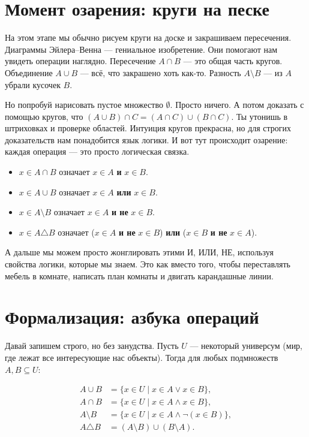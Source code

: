 \section{Момент озарения: круги на песке}
\label{sec:venn-insight}

На этом этапе мы обычно рисуем круги на доске и закрашиваем пересечения. Диаграммы Эйлера--Венна — гениальное изобретение. Они помогают нам увидеть операции наглядно. Пересечение $A \cap B$ — это общая часть кругов. Объединение $A \cup B$ — всё, что закрашено хоть как-то. Разность $A \setminus B$ — из $A$ убрали кусочек $B$.

Но попробуй нарисовать пустое множество $\emptyset$. Просто ничего. А потом доказать с помощью кругов, что $(A \cup B) \cap C = (A \cap C) \cup (B \cap C)$. Ты утонишь в штриховках и проверке областей. Интуиция кругов прекрасна, но для строгих доказательств нам понадобится язык логики. И вот тут происходит озарение: каждая операция — это просто логическая связка.

\begin{itemize}
  \item $x \in A \cap B$ \quad означает \quad $x \in A$ \textbf{и} $x \in B$.
  \item $x \in A \cup B$ \quad означает \quad $x \in A$ \textbf{или} $x \in B$.
  \item $x \in A \setminus B$ \quad означает \quad $x \in A$ \textbf{и не} $x \in B$.
  \item $x \in A \triangle B$ \quad означает \quad ($x \in A$ \textbf{и не} $x \in B$) \textbf{или} ($x \in B$ \textbf{и не} $x \in A$).
\end{itemize}

А дальше мы можем просто жонглировать этими И, ИЛИ, НЕ, используя свойства логики, которые мы знаем. Это как вместо того, чтобы переставлять мебель в комнате, написать план комнаты и двигать карандашные линии.

\section{Формализация: азбука операций}
\label{sec:operations-formal}

Давай запишем строго, но без занудства. Пусть $U$ — некоторый универсум (мир, где лежат все интересующие нас объекты). Тогда для любых подмножеств $A, B \subseteq U$:

\begin{align}
  A \cup B &= \{x \in U \mid x \in A \lor x \in B\},\\
  A \cap B &= \{x \in U \mid x \in A \land x \in B\},\\
  A \setminus B &= \{x \in U \mid x \in A \land \lnot (x \in B)\},\\
  A \triangle B &= (A \setminus B) \cup (B \setminus A).
\end{align}

